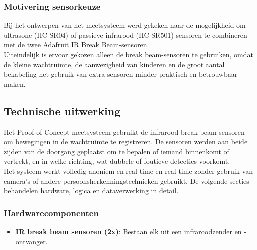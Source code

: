 

\subsubsection{Motivering sensorkeuze}
Bij het ontwerpen van het meetsysteem werd gekeken naar de mogelijkheid om ultrasone (HC-SR04) of passieve infrarood (HC-SR501) sensoren te combineren met de twee Adafruit IR Break Beam-sensoren. \\

Uiteindelijk is ervoor gekozen alleen de break beam-sensoren te gebruiken, omdat de kleine wachtruimte, de aanwezigheid van kinderen en de groot aantal bekabeling het gebruik van extra sensoren minder praktisch en betrouwbaar maken. \\

\subsection{Technische uitwerking}
Het Proof-of-Concept meetsysteem gebruikt de infrarood break beam-sensoren om bewegingen in de wachtruimte te registreren. De sensoren werden aan beide zijden van de doorgang geplaatst om te bepalen of iemand binnenkomt of vertrekt, en in welke richting, wat dubbele of foutieve detecties voorkomt.\\

Het systeem werkt volledig anoniem en real-time en real-time zonder gebruik van camera’s of andere persoonsherkenningstechnieken gebruikt. De volgende secties behandelen hardware, logica en dataverwerking in detail.

\subsubsection{Hardwarecomponenten}
\begin{itemize}
    \textbf{ESP32-WROOM}: Wordt ingezet voor het uitlezen van de IR-sensoren en het versturen van bezettingsdata naar InfluxDB via Wi-Fi.   
    \item \textbf{IR break beam sensoren (2x)}: Bestaan elk uit een infraroodzender en -ontvanger.
\end{itemize}

